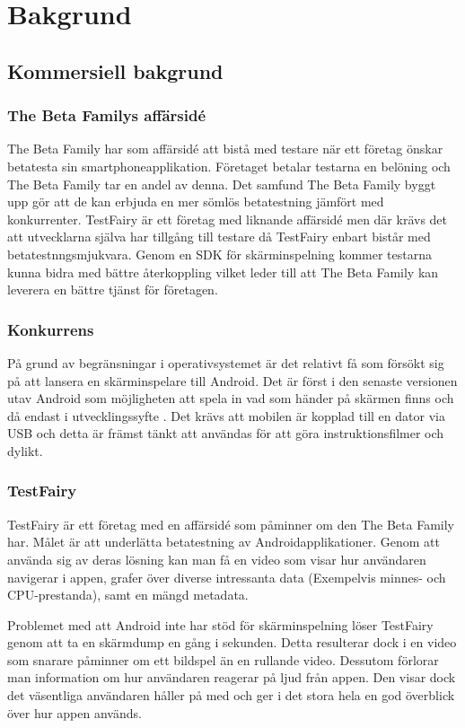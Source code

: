 \section{Bakgrund}
\subsection{Kommersiell bakgrund}
\label{subsec:commercial}
\subsubsection{The Beta Familys affärsidé}
The Beta Family har som affärsidé att bistå med testare när ett företag önskar betatesta sin smartphoneapplikation. Företaget betalar testarna en belöning och The Beta Family tar en andel av denna. Det samfund The Beta Family byggt upp gör att de kan erbjuda en mer sömlös betatestning jämfört med konkurrenter. TestFairy är ett företag med liknande affärsidé men där krävs det att utvecklarna själva har tillgång till testare då TestFairy enbart bistår med betatestnngsmjukvara. Genom en SDK för skärminspelning kommer testarna kunna bidra med bättre återkoppling vilket leder till att The Beta Family kan leverera en bättre tjänst för företagen.

\subsubsection{Konkurrens}
På grund av begränsningar i operativsystemet är det relativt få som försökt sig på att lansera en skärminspelare till Android. Det är först i den senaste versionen utav Android som möjligheten att spela in vad som händer på skärmen finns och då endast i utvecklingssyfte \parencite{kitkat}. Det krävs att mobilen är kopplad till en dator via USB och detta är främst tänkt att användas för att göra instruktionsfilmer och dylikt.

\subsubsection{TestFairy}
\label{testfairy}
TestFairy är ett företag med en affärsidé som påminner om den The Beta Family har. Målet är att underlätta betatestning av Androidapplikationer. Genom att använda sig av deras lösning kan man få en video som visar hur användaren navigerar i appen, grafer över diverse intressanta data (Exempelvis minnes- och CPU-prestanda), samt en mängd metadata.

Problemet med att Android inte har stöd för skärminspelning löser TestFairy genom att ta en skärmdump en gång i sekunden. Detta resulterar dock i en video som snarare påminner om ett bildspel än en rullande video. Dessutom förlorar man information om hur användaren reagerar på ljud från appen. Den visar dock det väsentliga användaren håller på med och ger i det stora hela en god överblick över hur appen används.

